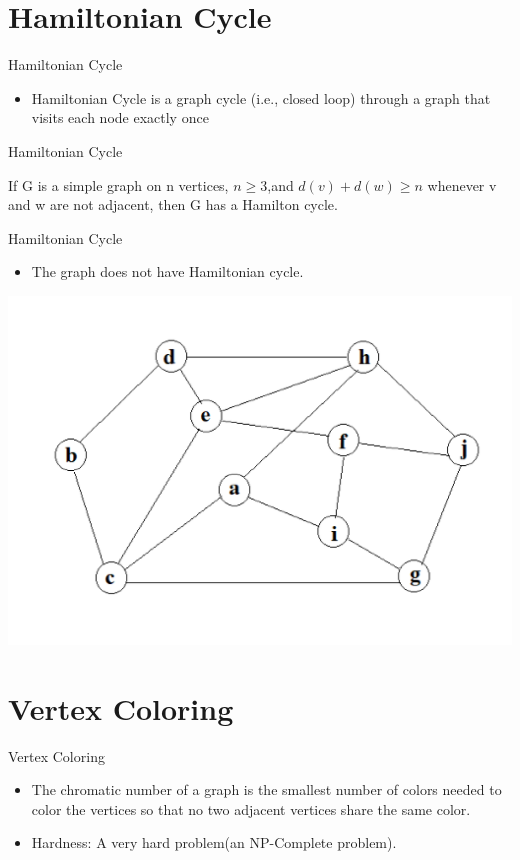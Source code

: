 \documentclass{beamer}
\begin{document}
\section{Hamiltonian Cycle}

\begin{frame}{Hamiltonian Cycle}
   \begin{itemize}
        \item Hamiltonian Cycle is a graph cycle (i.e., closed loop) through a graph that visits each node exactly once 
    \end{itemize}
\end{frame}

\begin{frame}{Hamiltonian Cycle}
    \begin{theorem}
        If G is a simple graph on n vertices, $n\geq 3$,and $d(v)+d(w)\geq n$ whenever v and w are not adjacent, then G has a Hamilton cycle. 
    \end{theorem}
\end{frame}

\begin{frame}{Hamiltonian Cycle}
    \begin{itemize}
        \item The graph does not have Hamiltonian cycle.
    \end{itemize}
    \centering \includegraphics[width=.7\linewidth]{p1.jpg}
\end{frame}

\section{Vertex Coloring}

\begin{frame}{Vertex Coloring}
    \begin{itemize}
        \item The chromatic number of a graph  is the smallest number of colors needed to color the vertices so that no two adjacent vertices share the same color.
        \item Hardness: A very hard problem(an NP-Complete problem).
    \end{itemize}
\end{frame}
\end{document}
